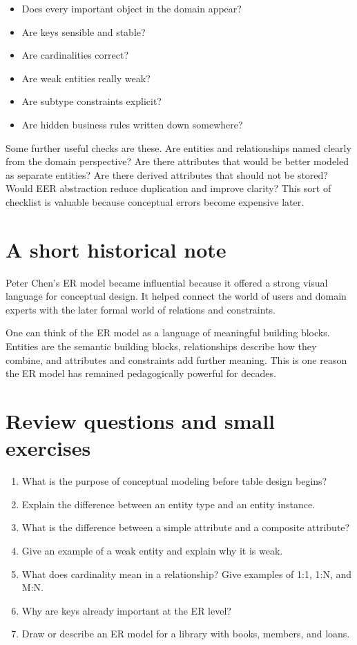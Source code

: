 \documentclass[11pt,a4paper,openany]{book}
\begin{document}
\begin{itemize}
\item Does every important object in the domain appear?
\item Are keys sensible and stable?
\item Are cardinalities correct?
\item Are weak entities really weak?
\item Are subtype constraints explicit?
\item Are hidden business rules written down somewhere?
\end{itemize}

Some further useful checks are these. Are entities and relationships named clearly from the domain perspective? Are there attributes that would be better modeled as separate entities? Are there derived attributes that should not be stored? Would EER abstraction reduce duplication and improve clarity? This sort of checklist is valuable because conceptual errors become expensive later.

\section{A short historical note}
Peter Chen's ER model became influential because it offered a strong visual language for conceptual design. It helped connect the world of users and domain experts with the later formal world of relations and constraints.

One can think of the ER model as a language of meaningful building blocks. Entities are the semantic building blocks, relationships describe how they combine, and attributes and constraints add further meaning. This is one reason the ER model has remained pedagogically powerful for decades.

\section{Review questions and small exercises}
\begin{enumerate}
\item What is the purpose of conceptual modeling before table design begins?
\item Explain the difference between an entity type and an entity instance.
\item What is the difference between a simple attribute and a composite attribute?
\item Give an example of a weak entity and explain why it is weak.
\item What does cardinality mean in a relationship? Give examples of 1:1, 1:N, and M:N.
\item Why are keys already important at the ER level?
\item Draw or describe an ER model for a library with books, members, and loans.
\end{enumerate}
\end{document}
